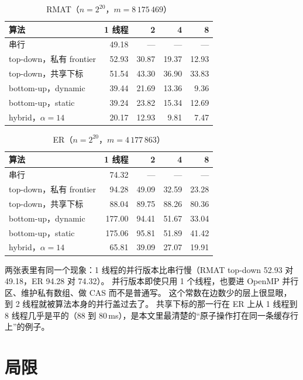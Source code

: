 \documentclass[11pt,a4paper]{ctexart}
\begin{document}
\begin{table}[H]
\centering
\caption{RMAT（$n=2^{20}$，$m=8\,175\,469$）}
\label{tab:rmatall}
\small
\begin{tabular}{lrrrr}
\toprule
算法 & 1 线程 & 2 & 4 & 8 \\
\midrule
串行 & 49.18 & --- & --- & --- \\
top-down，私有 frontier & 52.93 & 30.87 & 19.37 & 12.93 \\
top-down，共享下标 & 51.54 & 43.30 & 36.90 & 33.83 \\
bottom-up，dynamic & 39.44 & 21.69 & 13.36 & 9.36 \\
bottom-up，static & 39.24 & 23.82 & 15.34 & 12.69 \\
hybrid，$\alpha=14$ & 20.17 & 12.93 & 9.81 & 7.47 \\
\bottomrule
\end{tabular}
\end{table}

\begin{table}[H]
\centering
\caption{ER（$n=2^{20}$，$m=4\,177\,863$）}
\label{tab:erall}
\small
\begin{tabular}{lrrrr}
\toprule
算法 & 1 线程 & 2 & 4 & 8 \\
\midrule
串行 & 74.32 & --- & --- & --- \\
top-down，私有 frontier & 94.28 & 49.09 & 32.59 & 23.28 \\
top-down，共享下标 & 88.04 & 89.75 & 88.26 & 80.36 \\
bottom-up，dynamic & 177.00 & 94.41 & 51.67 & 33.04 \\
bottom-up，static & 175.06 & 95.81 & 51.89 & 41.42 \\
hybrid，$\alpha=14$ & 65.81 & 39.09 & 27.07 & 19.91 \\
\bottomrule
\end{tabular}
\end{table}

两张表里有同一个现象：1 线程的并行版本比串行慢（RMAT top-down 52.93 对 49.18，ER 94.28 对 74.32）。
并行版本即使只用 1 个线程，也要进 OpenMP 并行区、维护私有数组、做 CAS 而不是普通写。
这个常数在边数少的层上很显眼，到 2 线程就被算法本身的并行盖过去了。
共享下标的那一行在 ER 上从 1 线程到 8 线程几乎是平的（88 到 80\,ms），是本文里最清楚的``原子操作打在同一条缓存行上''的例子。

\section{局限}
\label{sec:limits}
\end{document}
